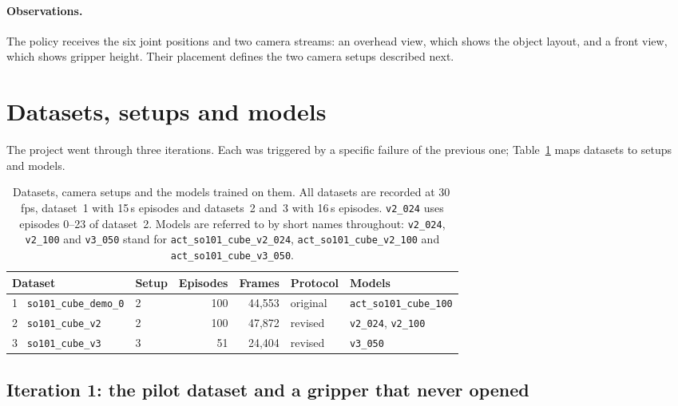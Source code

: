 \documentclass[11pt,a4paper]{article}
\begin{document}
\paragraph{Observations.} The policy receives the six joint positions and two
camera streams: an overhead view, which shows the object layout, and a front
view, which shows gripper height. Their placement defines the two camera
setups described next.

\section{Datasets, setups and models}
\label{sec:progression}

The project went through three iterations. Each was triggered by a specific
failure of the previous one; Table~\ref{tab:progression} maps datasets to
setups and models.

\begin{table}[h]
\centering
\small
\begin{tabular}{@{}llrrll@{}}
\toprule
\textbf{Dataset} & \textbf{Setup} & \textbf{Episodes} & \textbf{Frames} & \textbf{Protocol} & \textbf{Models} \\
\midrule
1 \ \texttt{so101\_cube\_demo\_0} & 2 & 100 & 44{,}553 & original & \texttt{act\_so101\_cube\_100} \\
2 \ \texttt{so101\_cube\_v2}      & 2 & 100 & 47{,}872 & revised  & \texttt{v2\_024}, \texttt{v2\_100} \\
3 \ \texttt{so101\_cube\_v3}      & 3 &  51 & 24{,}404 & revised  & \texttt{v3\_050} \\
\bottomrule
\end{tabular}
\caption{Datasets, camera setups and the models trained on them. All datasets
are recorded at 30\,fps, dataset~1 with 15\,s episodes and datasets~2 and~3
with 16\,s episodes. \texttt{v2\_024} uses episodes 0--23 of dataset~2. Models are referred to by short names throughout:
\texttt{v2\_024}, \texttt{v2\_100} and \texttt{v3\_050} stand for
\texttt{act\_so101\_cube\_v2\_024}, \texttt{act\_so101\_cube\_v2\_100} and
\texttt{act\_so101\_cube\_v3\_050}.}
\label{tab:progression}
\end{table}

\subsection{Iteration 1: the pilot dataset and a gripper that never opened}
\label{sec:gripper}
\end{document}

